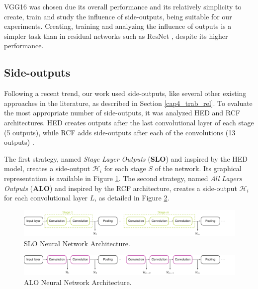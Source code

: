 VGG16 was chosen due its overall performance and its relatively simplicity to create, train and study the influence of side-outputs, being suitable for our experiments. 
Creating, training and analyzing the influence of outputs is a simpler task than in residual networks such as ResNet \cite{RESNET:2016:7780459}, despite its higher performance.

\subsection{Side-outputs}
\label{cap5_saidas_laterais}

Following a recent trend, our work used side-outputs, like several other existing approaches in the literature, as described in Section \ref{cap4_trab_rel}.
To evaluate the most appropriate number of side-outputs, it was analyzed HED and RCF architectures.
HED creates outputs after the last convolutional layer of each stage (5 outputs), while RCF adds side-outputs after each of the convolutions (13 outputs) \cite{Xie:2017:HED:3158436.3158453} \cite{RCF:2017:8100105}.

The first strategy, named \textit{Stage Layer Outputs} (\textbf{SLO}) and inspired by the HED model, creates a side-output $\mathcal{H}_i$ for each stage $S$ of the network.
Its graphical representation is available in Figure \ref{fig:architecture_slo}.
The second strategy, named \textit{All Layers Outputs} (\textbf{ALO}) and inspired by the RCF architecture, creates a side-output $\mathcal{H}_i$ for each convolutional layer $L$, as detailed in Figure \ref{fig:architecture_alo}.

\begin{figure}
  \centering
  \includegraphics[width=1\textwidth]{../imagens/ilustracoes/cap6_arquitetura_slo.png} %
  \caption{SLO Neural Network Architecture.}
  \label{fig:architecture_slo}
\end{figure}

\begin{figure}
  \centering
  \includegraphics[width=1\textwidth]{../imagens/ilustracoes/cap6_arquitetura_alo.png} %
  \caption{ALO Neural Network Architecture.}
  \label{fig:architecture_alo}
\end{figure}

